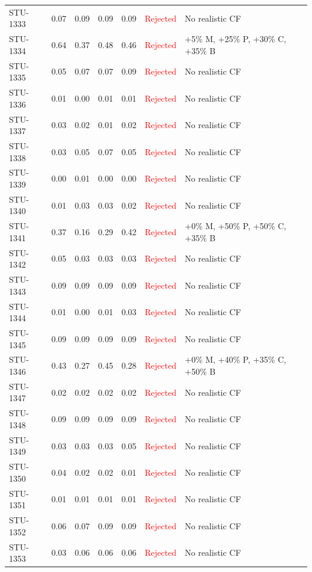 \begin{longtable}{l c c c c | c | l}
STU-1333 & 0.07 & 0.09 & 0.09 & 0.09 & \textcolor{red}{Rejected} & No realistic CF \\
STU-1334 & 0.64 & 0.37 & 0.48 & 0.46 & \textcolor{red}{Rejected} & +5\% M, +25\% P, +30\% C, +35\% B \\
STU-1335 & 0.05 & 0.07 & 0.07 & 0.09 & \textcolor{red}{Rejected} & No realistic CF \\
STU-1336 & 0.01 & 0.00 & 0.01 & 0.01 & \textcolor{red}{Rejected} & No realistic CF \\
STU-1337 & 0.03 & 0.02 & 0.01 & 0.02 & \textcolor{red}{Rejected} & No realistic CF \\
STU-1338 & 0.03 & 0.05 & 0.07 & 0.05 & \textcolor{red}{Rejected} & No realistic CF \\
STU-1339 & 0.00 & 0.01 & 0.00 & 0.00 & \textcolor{red}{Rejected} & No realistic CF \\
STU-1340 & 0.01 & 0.03 & 0.03 & 0.02 & \textcolor{red}{Rejected} & No realistic CF \\
STU-1341 & 0.37 & 0.16 & 0.29 & 0.42 & \textcolor{red}{Rejected} & +0\% M, +50\% P, +50\% C, +35\% B \\
STU-1342 & 0.05 & 0.03 & 0.03 & 0.03 & \textcolor{red}{Rejected} & No realistic CF \\
STU-1343 & 0.09 & 0.09 & 0.09 & 0.09 & \textcolor{red}{Rejected} & No realistic CF \\
STU-1344 & 0.01 & 0.00 & 0.01 & 0.03 & \textcolor{red}{Rejected} & No realistic CF \\
STU-1345 & 0.09 & 0.09 & 0.09 & 0.09 & \textcolor{red}{Rejected} & No realistic CF \\
STU-1346 & 0.43 & 0.27 & 0.45 & 0.28 & \textcolor{red}{Rejected} & +0\% M, +40\% P, +35\% C, +50\% B \\
STU-1347 & 0.02 & 0.02 & 0.02 & 0.02 & \textcolor{red}{Rejected} & No realistic CF \\
STU-1348 & 0.09 & 0.09 & 0.09 & 0.09 & \textcolor{red}{Rejected} & No realistic CF \\
STU-1349 & 0.03 & 0.03 & 0.03 & 0.05 & \textcolor{red}{Rejected} & No realistic CF \\
STU-1350 & 0.04 & 0.02 & 0.02 & 0.01 & \textcolor{red}{Rejected} & No realistic CF \\
STU-1351 & 0.01 & 0.01 & 0.01 & 0.01 & \textcolor{red}{Rejected} & No realistic CF \\
STU-1352 & 0.06 & 0.07 & 0.09 & 0.09 & \textcolor{red}{Rejected} & No realistic CF \\
STU-1353 & 0.03 & 0.06 & 0.06 & 0.06 & \textcolor{red}{Rejected} & No realistic CF \\

\end{longtable}
